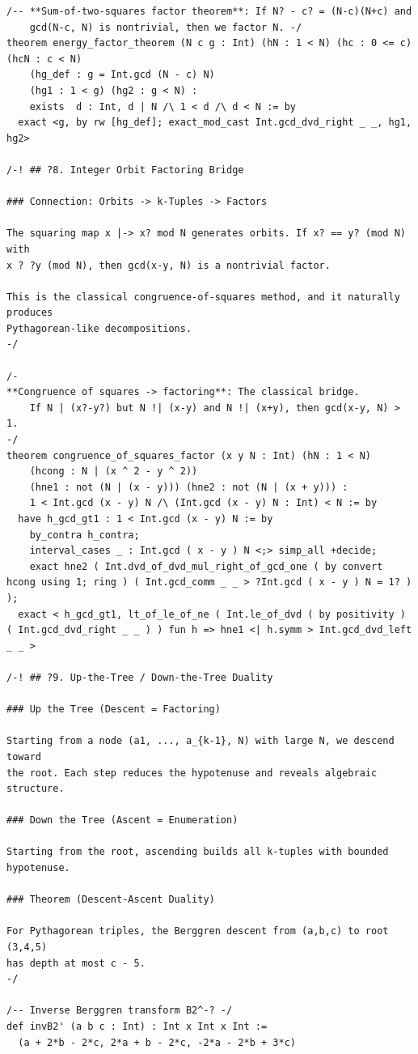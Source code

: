 \documentclass[11pt,twoside,openright]{book}
\theoremstyle{definition}
\theoremstyle{remark}
\begin{document}
\begin{lstlisting}[style=lean]
/-- **Sum-of-two-squares factor theorem**: If N? - c? = (N-c)(N+c) and
    gcd(N-c, N) is nontrivial, then we factor N. -/
theorem energy_factor_theorem (N c g : Int) (hN : 1 < N) (hc : 0 <= c) (hcN : c < N)
    (hg_def : g = Int.gcd (N - c) N)
    (hg1 : 1 < g) (hg2 : g < N) :
    exists  d : Int, d | N /\ 1 < d /\ d < N := by
  exact <g, by rw [hg_def]; exact_mod_cast Int.gcd_dvd_right _ _, hg1, hg2>

/-! ## ?8. Integer Orbit Factoring Bridge

### Connection: Orbits -> k-Tuples -> Factors

The squaring map x |-> x? mod N generates orbits. If x? == y? (mod N) with
x ? ?y (mod N), then gcd(x-y, N) is a nontrivial factor.

This is the classical congruence-of-squares method, and it naturally produces
Pythagorean-like decompositions.
-/

/-
**Congruence of squares -> factoring**: The classical bridge.
    If N | (x?-y?) but N !| (x-y) and N !| (x+y), then gcd(x-y, N) > 1.
-/
theorem congruence_of_squares_factor (x y N : Int) (hN : 1 < N)
    (hcong : N | (x ^ 2 - y ^ 2))
    (hne1 : not (N | (x - y))) (hne2 : not (N | (x + y))) :
    1 < Int.gcd (x - y) N /\ (Int.gcd (x - y) N : Int) < N := by
  have h_gcd_gt1 : 1 < Int.gcd (x - y) N := by
    by_contra h_contra;
    interval_cases _ : Int.gcd ( x - y ) N <;> simp_all +decide;
    exact hne2 ( Int.dvd_of_dvd_mul_right_of_gcd_one ( by convert hcong using 1; ring ) ( Int.gcd_comm _ _ > ?Int.gcd ( x - y ) N = 1? ) );
  exact < h_gcd_gt1, lt_of_le_of_ne ( Int.le_of_dvd ( by positivity ) ( Int.gcd_dvd_right _ _ ) ) fun h => hne1 <| h.symm > Int.gcd_dvd_left _ _ >

/-! ## ?9. Up-the-Tree / Down-the-Tree Duality

### Up the Tree (Descent = Factoring)

Starting from a node (a1, ..., a_{k-1}, N) with large N, we descend toward
the root. Each step reduces the hypotenuse and reveals algebraic structure.

### Down the Tree (Ascent = Enumeration)

Starting from the root, ascending builds all k-tuples with bounded hypotenuse.

### Theorem (Descent-Ascent Duality)

For Pythagorean triples, the Berggren descent from (a,b,c) to root (3,4,5)
has depth at most c - 5.
-/

/-- Inverse Berggren transform B2^-? -/
def invB2' (a b c : Int) : Int x Int x Int :=
  (a + 2*b - 2*c, 2*a + b - 2*c, -2*a - 2*b + 3*c)


\end{lstlisting}
\end{document}
